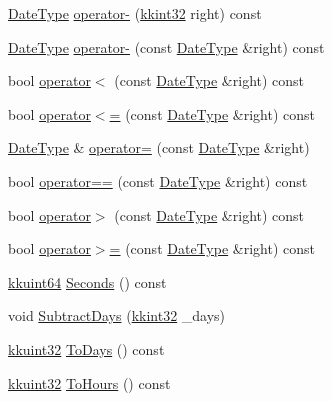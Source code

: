 \begin{DoxyCompactItemize}
\item 
\hyperlink{class_k_k_b_1_1_date_type}{Date\+Type} \hyperlink{class_k_k_b_1_1_date_type_afbedc9072cf551173574098e22654ee2}{operator-\/} (\hyperlink{namespace_k_k_b_a8fa4952cc84fda1de4bec1fbdd8d5b1b}{kkint32} right) const 
\item 
\hyperlink{class_k_k_b_1_1_date_type}{Date\+Type} \hyperlink{class_k_k_b_1_1_date_type_a3cc656df01c86a3c08cd87666e22a22f}{operator-\/} (const \hyperlink{class_k_k_b_1_1_date_type}{Date\+Type} \&right) const 
\item 
bool \hyperlink{class_k_k_b_1_1_date_type_af8f598ea9460f80cf48b30ee0b35d93d}{operator$<$} (const \hyperlink{class_k_k_b_1_1_date_type}{Date\+Type} \&right) const 
\item 
bool \hyperlink{class_k_k_b_1_1_date_type_a465493591db95d3f01b8bcc2d3d7c689}{operator$<$=} (const \hyperlink{class_k_k_b_1_1_date_type}{Date\+Type} \&right) const 
\item 
\hyperlink{class_k_k_b_1_1_date_type}{Date\+Type} \& \hyperlink{class_k_k_b_1_1_date_type_ac50f03fe45390e17eaa7527bd1dc0bbb}{operator=} (const \hyperlink{class_k_k_b_1_1_date_type}{Date\+Type} \&right)
\item 
bool \hyperlink{class_k_k_b_1_1_date_type_a5a7c0e7764fa6430778bf258ec6463dc}{operator==} (const \hyperlink{class_k_k_b_1_1_date_type}{Date\+Type} \&right) const 
\item 
bool \hyperlink{class_k_k_b_1_1_date_type_abf0c83062ca606631a50155860869125}{operator$>$} (const \hyperlink{class_k_k_b_1_1_date_type}{Date\+Type} \&right) const 
\item 
bool \hyperlink{class_k_k_b_1_1_date_type_a1ee2165320a532da71757fdb309d9bce}{operator$>$=} (const \hyperlink{class_k_k_b_1_1_date_type}{Date\+Type} \&right) const 
\item 
\hyperlink{namespace_k_k_b_a1f2b0568d3b63cc7697dcff73250113e}{kkuint64} \hyperlink{class_k_k_b_1_1_date_type_a6f20551f9a6b56cc5af99873624f1092}{Seconds} () const 
\item 
void \hyperlink{class_k_k_b_1_1_date_type_a59363fc69fabce02b5d10d40d3022fc4}{Subtract\+Days} (\hyperlink{namespace_k_k_b_a8fa4952cc84fda1de4bec1fbdd8d5b1b}{kkint32} \+\_\+days)
\item 
\hyperlink{namespace_k_k_b_af8d832f05c54994a1cce25bd5743e19a}{kkuint32} \hyperlink{class_k_k_b_1_1_date_type_ae86a861d5a8bc1a94a4ec6243ee7041a}{To\+Days} () const 
\item 
\hyperlink{namespace_k_k_b_af8d832f05c54994a1cce25bd5743e19a}{kkuint32} \hyperlink{class_k_k_b_1_1_date_type_af9b4820b07fa57d902c76b86c9f129ee}{To\+Hours} () const 

\end{DoxyCompactItemize}
